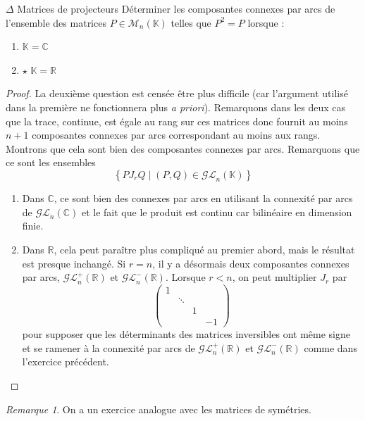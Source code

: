 \documentclass[french,a4paper]{article}
\newcommand{\R}{\mathbb{R}}
\newcommand{\C}{\mathbb{C}}
\newcommand{\K}{\mathbb{K}}
\theoremstyle{plain}
\theoremstyle{definition}
\theoremstyle{remark}
\newtheorem*{rmq}{Remarque}
\begin{document}
\begin{ex}{$\Delta$ Matrices de projecteurs}
	Déterminer les composantes connexes par arcs de l'ensemble des matrices $P\in\mathcal{M}_n(\K)$ telles que $P^2=P$ lorsque :
	\begin{enumerate}
		\item $\K=\C$
		\item $\star$ $\K=\R$
	\end{enumerate} 
\end{ex}
\begin{proof}
	La deuxième question est censée être plus difficile (car l'argument utilisé dans la première ne fonctionnera plus \textit{a priori}). Remarquons dans les deux cas que la trace, continue, est égale au rang sur ces matrices donc fournit au moins $n+1$ composantes connexes par arcs correspondant au moins aux rangs. Montrons que cela sont bien des composantes connexes par arcs. Remarquons que ce sont les ensembles $$\left\{PJ_rQ\mid (P,Q)\in\mathcal{GL}_n(\K)\right\}$$
	\begin{enumerate}
		\item Dans $\C$, ce sont bien des connexes par arcs en utilisant la connexité par arcs de $\mathcal{GL}_n(\C)$ et le fait que le produit est continu car bilinéaire en dimension finie.
		\item Dans $\R$, cela peut paraître plus compliqué au premier abord, mais le résultat est presque inchangé. Si $r=n$, il y a désormais deux composantes connexes par arcs, $\mathcal{GL}_n^+(\R)$ et $\mathcal{GL}_n^-(\R)$. Lorsque $r<n$, on peut multiplier $J_r$ par $$\begin{pmatrix}
			1&&\\
			&\ddots&&\\
			&&1&\\
			&&&-1
		\end{pmatrix}$$ pour supposer que les déterminants des matrices inversibles ont même signe et se ramener à la connexité par arcs de $\mathcal{GL}_n^+(\R)$ et $\mathcal{GL}_n^-(\R)$ comme dans l'exercice précédent.
	\end{enumerate}
\end{proof}
\begin{rmq}
	On a un exercice analogue avec les matrices de symétries.
\end{rmq}
\end{document}
